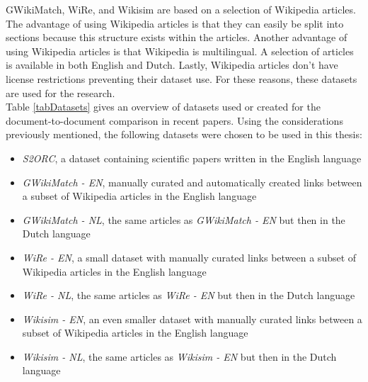 GWikiMatch, WiRe, and Wikisim are based on a selection of Wikipedia articles. The advantage of using Wikipedia articles is that they can easily be split into sections because this structure exists within the articles. Another advantage of using Wikipedia articles is that Wikipedia is multilingual. A selection of articles is available in both English and Dutch. Lastly, Wikipedia articles don’t have license restrictions preventing their dataset use. For these reasons, these datasets are used for the research. \\

Table \ref{tabDatasets} gives an overview of datasets used or created for the document-to-document comparison in recent papers. Using the considerations previously mentioned, the following datasets were chosen to be used in this thesis:

\begin{itemize}
  \item \textit{S2ORC}, a dataset containing scientific papers written in the English language
  \item \textit{GWikiMatch - EN}, manually curated and automatically created links between a subset of Wikipedia articles in the English language
  \item \textit{GWikiMatch - NL}, the same articles as \textit{GWikiMatch - EN} but then in the Dutch language
  \item \textit{WiRe - EN}, a small dataset with manually curated links between a subset of Wikipedia articles in the English language
  \item \textit{WiRe - NL}, the same articles as \textit{WiRe - EN} but then in the Dutch language
  \item \textit{Wikisim - EN}, an even smaller dataset with manually curated links between a subset of Wikipedia articles in the English language  
  \item \textit{Wikisim - NL}, the same articles as \textit{Wikisim - EN} but then in the Dutch language
\end{itemize}

\\

